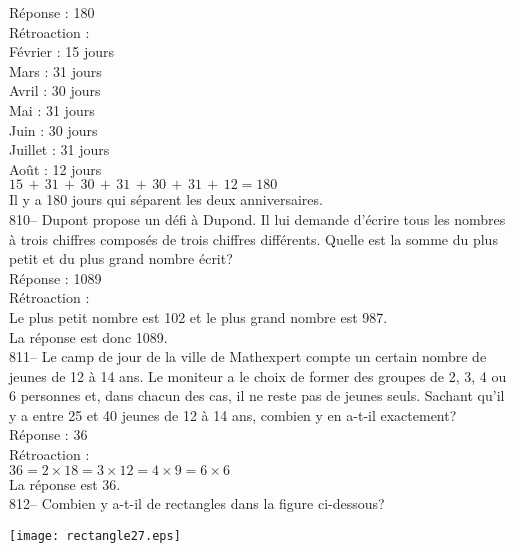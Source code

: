﻿\documentclass[letterpaper, 12pt]{article}
\begin{document}
R\'eponse : 180\\

R\'etroaction : \\
F\'evrier : 15 jours\\
Mars : 31 jours\\
Avril : 30 jours\\
Mai : 31 jours\\
Juin : 30 jours\\
Juillet : 31 jours\\
Ao\^ut : 12 jours\\

$15\,+\,31\,+\,30\,+\,31\,+\,30\,+\,31\,+\,12=180$\\

Il y a 180 jours qui s\'eparent les deux anniversaires.\\

810-- Dupont propose un d\'efi \`a Dupond.  Il lui demande d'\'ecrire tous
les nombres \`a trois chiffres compos\'es de trois chiffres diff\'erents.
Quelle est la somme du plus petit et du plus grand nombre \'ecrit?\\

R\'eponse : 1089\\

R\'etroaction : \\
Le plus petit nombre est 102 et le plus grand nombre est 987.\\
La r\'eponse est donc 1089.\\

811-- Le camp de jour de la ville de Mathexpert compte un certain nombre de
jeunes de 12 \`a 14 ans.  Le moniteur a le choix de former des groupes de 2,
3, 4 ou 6 personnes et, dans chacun des cas, il ne reste pas de jeunes
seuls.  Sachant qu'il y a entre 25 et 40 jeunes de 12 \`a 14 ans, combien y
en a-t-il exactement?\\

R\'eponse : 36\\

R\'etroaction : \\
$36=2\times18=3\times12=4\times9=6\times6$\\
La r\'eponse est 36.\\

812-- Combien y a-t-il de rectangles dans la figure ci-dessous?\\
    \begin{center}
    \texttt{[image: rectangle27.eps]}
    \end{center}
\end{document}
